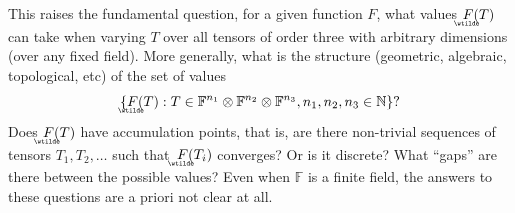 \documentclass{daj}
\newcommand{\FF}{\mathbb{F}}
\newcommand{\NN}{\mathbb{N}}
\begin{document}
This raises the fundamental question, for a given function $F$,
    what values $\underaccent{\wtilde}{F}(T)$ can take when varying $T$ over all tensors of order three with arbitrary dimensions (over any fixed field). %
    More generally, what is the structure (geometric, algebraic, topological, etc) of the set of values 
    \[
    \{\underaccent{\wtilde}{F}(T) : T \in \FF^{n_1} \otimes \FF^{n_2} \otimes \FF^{n_3}, n_1, n_2, n_3 \in \NN\}?
    \]
    Does $\underaccent{\wtilde}{F}(T)$ have accumulation points, that is, are there non-trivial sequences %
    of tensors $T_1, T_2, \ldots$ such that~$\underaccent{\wtilde}{F}(T_i)$ converges?
    Or is it discrete? 
    What ``gaps'' are there between the possible values? Even when $\FF$ is a finite field, the answers to these questions are a priori not clear at all.
\end{document}
